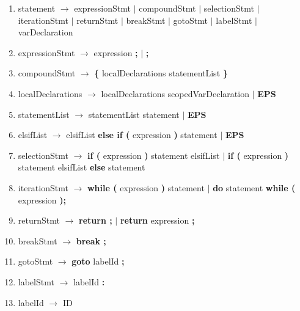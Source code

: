 \documentclass{article}
\begin{document}
\begin{enumerate}
\item statement $\rightarrow$ expressionStmt $|$ compoundStmt $|$ selectionStmt $|$ iterationStmt $|$ returnStmt $|$ breakStmt $|$ gotoStmt $|$ labelStmt $|$ varDeclaration
\item expressionStmt $\rightarrow$ expression \textbf{;} $|$ \textbf{;}
\item compoundStmt $\rightarrow$ \textbf{\{} localDeclarations statementList \textbf{\}}
\item localDeclarations $\rightarrow$ localDeclarations scopedVarDeclaration $|$ \textbf{EPS}
\item statementList $\rightarrow$ statementList statement $|$ \textbf{EPS}
\item elsifList $\rightarrow$ elsifList \textbf{else if (} expression \textbf{)} statement $|$ \textbf{EPS}
\item selectionStmt $\rightarrow$ \textbf{if (} expression \textbf{)} statement elsifList $|$ \textbf{if (} expression \textbf{)} statement elsifList \textbf{else} statement
\item iterationStmt $\rightarrow$ \textbf{while (} expression \textbf{)} statement $|$ \textbf{do} statement \textbf{while (} expression \textbf{);}
\item returnStmt $\rightarrow$ \textbf{return ;} $|$ \textbf{return} expression \textbf{;}
\item breakStmt $\rightarrow$ \textbf{break ;}
\item gotoStmt $\rightarrow$ \textbf{goto} labelId \textbf{;}
\item labelStmt $\rightarrow$ labelId \textbf{:}
\item labelId $\rightarrow$ ID


\end{enumerate}
\end{document}
